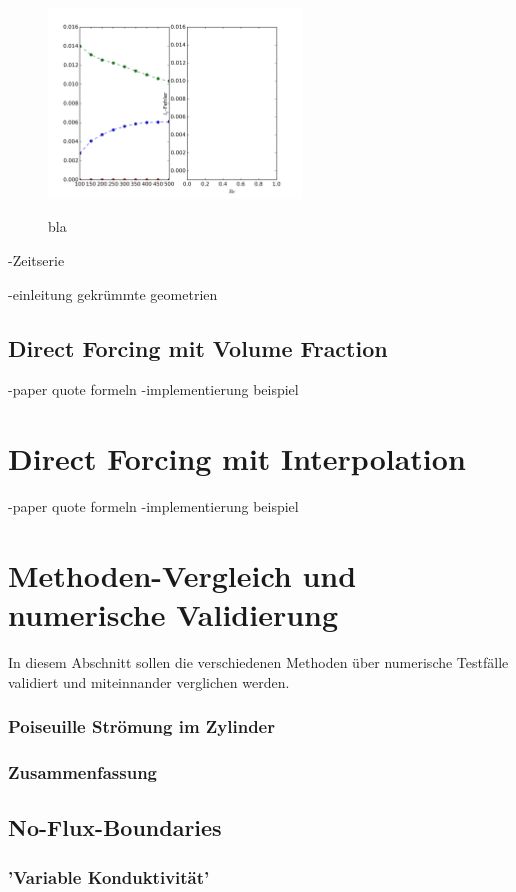 \begin{figure}[!tpb]
  \centering
  \includegraphics[width=0.6\textwidth]{gfx/immersed_boundary_methods/dfo2o4.png}\label{fig:df_o2o4}
  \caption{bla}
\end{figure}

-Zeitserie

-einleitung gekrümmte geometrien

\subsection{Direct Forcing mit Volume Fraction}
-paper quote formeln
-implementierung beispiel

\section{Direct Forcing mit Interpolation}
-paper quote formeln
-implementierung beispiel

\section{Methoden-Vergleich und numerische Validierung}
In diesem Abschnitt sollen die verschiedenen Methoden über numerische Testfälle validiert und miteinnander
verglichen werden.


\subsubsection{Poiseuille Strömung im Zylinder}

\subsubsection{Zusammenfassung}


\subsection{No-Flux-Boundaries}

\subsubsection{'Variable Konduktivität'}










